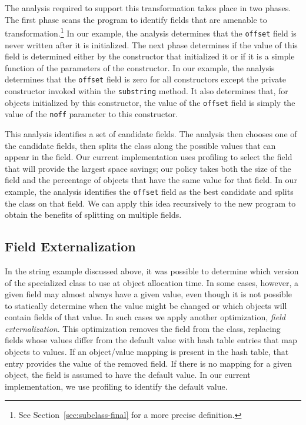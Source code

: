\documentclass[oribibl]{llncs}
\begin{document}
The analysis required to support this transformation takes place
in two phases. The first phase scans the program
to identify fields that
are amenable to transformation.\footnote{See
  Section~\ref{sec:subclass-final} for a more precise definition.}
In our example, the analysis
determines that the {\tt offset} field is never written after
it is initialized. The next phase determines if the value
of this field is determined either by the constructor that
initialized it or if it is a simple function of the parameters
of the constructor. In our example, the analysis determines
that the {\tt offset} field is zero for all constructors
except the private constructor invoked within the {\tt substring}
method. It also determines that, for objects initialized by 
this constructor, the value of the {\tt offset} field is simply
the value of the {\tt noff} parameter to this constructor. 

This analysis identifies a set of candidate fields. 
The analysis then chooses one of the candidate fields, then 
splits the class along the possible values
that can appear in the field. Our current implementation uses
profiling to select the field that will provide the largest
space savings; our policy takes both the size of the field
and the percentage of objects that have the same value for 
that field. In our example, the analysis identifies the 
{\tt offset} field as the best candidate and splits the class
on that field. We can apply this idea recursively to the 
new program to obtain the benefits of splitting on multiple
fields. 

\subsection{Field Externalization}

In the string example discussed above, it was possible to determine
which version of the specialized class to use at object allocation
time. In some cases, however, a given field may almost always have
a given value, even though it is not possible to statically determine
when the value might be changed or which objects will contain fields of that 
value. In such cases we apply another optimization, 
{\em field externalization}. This optimization removes the field
from the class, replacing fields whose values differ from the default 
value with hash table entries that map objects to values. If an object/value
mapping is present in the hash table, that entry provides the 
value of the removed field. If there is no mapping for a given object,
the field is assumed to have the default value. 
In our current implementation, we use profiling 
to identify the default value. 
\end{document}
